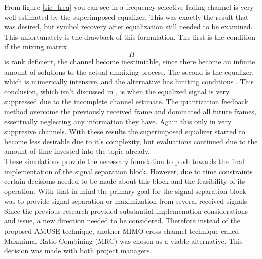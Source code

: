 %

From figure \ref{sie_freq} you can see in a frequency selective fading channel is very well estimated by the superimposed equalizer.  This was exactly the result that was desired, but symbol recovery after equalization still needed to be examined. This unfortunately is the drawback of this formulation.  The first is the condition if the mixing matrix $$H$$ is rank deficient, the channel become inestimiable,  since there become an infinite amount of solutions to the actual unmixing process.  The second is the equalizer, which is numerically intensive, and the alternative has limiting conditions \cite{Ghogho}.  This conclusion, which isn't discussed in \cite{Ghogho}, is when the equalized signal is very suppressed due to the incomplete channel estimate.  The quantization feedback method overcome the previously received frame and dominated all future frames, essentually neglecting any information they have.  Again this only in very suppresive channels.  With these results the superimposed equalizer started to become less desirable due to it's complexity, but evaluations continued due to the amount of time invested into the topic already.\\




These simulations provide the necessary foundation to push towards the final implementation of the signal separation block.  However, due to time constraints certain decisions needed to be made about this block and the feasibility of its operation.  With that in mind the primary goal for the signal separation block was to provide signal separation or maximization from several received signals.  Since the previous research provided substantial implemenation considerations and issue, a new direction needed to be considered.  Therefore instead of the proposed AMUSE\cite{AMUSE} technique, another MIMO cross-channel technique called Maxmimal Ratio Combining (MRC) was chosen as a viable alternative.  This decision was made with both project managers.\\

